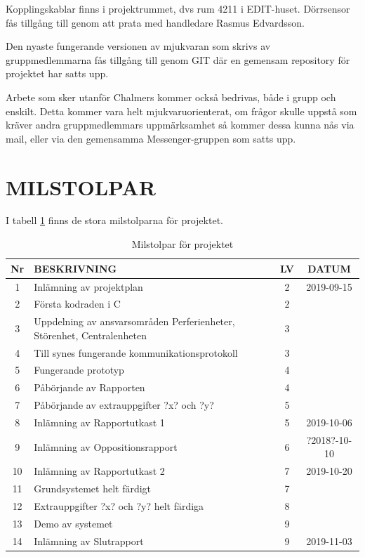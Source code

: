 \documentclass[a4paper]{article}
\begin{document}
Kopplingskablar finns i projektrummet, dvs rum 4211 i EDIT-huset. Dörrsensor fås tillgång till genom att prata med handledare Rasmus Edvardsson.

Den nyaste fungerande versionen av mjukvaran som skrivs av gruppmedlemmarna fås tillgång till genom GIT där en gemensam repository för projektet har satts upp.

Arbete som sker utanför Chalmers kommer också bedrivas, både i grupp och enskilt. Detta kommer vara helt mjukvaruorienterat, om frågor skulle uppstå som kräver andra gruppmedlemmars uppmärksamhet så kommer dessa kunna nås via mail, eller via den gemensamma Messenger-gruppen som satts upp.

\section{MILSTOLPAR}
\label{sec:milstolpar}

I tabell \ref{tab:milstolpar} finns de stora milstolparna för projektet.

	\begin{table}[b]
	\begin{tabular}{|c|l|c|c|}
		\hline
		Nr & BESKRIVNING & LV & DATUM \\ \hline \hline

		1 & Inlämning av projektplan & 2 & 2019-09-15 \\ \hline
		2 & Första kodraden i C & 2 & \\ \hline
		3 & Uppdelning av ansvarsområden Perferienheter, Störenhet, Centralenheten & 3 & \\ \hline
		4 & Till synes fungerande kommunikationsprotokoll & 3 & \\ \hline
		5 & Fungerande prototyp & 4 & \\ \hline
		6 & Påbörjande av Rapporten & 4 & \\ \hline
		7 & Påbörjande av extrauppgifter ?x? och ?y? & 5 & \\ \hline
		8 & Inlämning av Rapportutkast 1 & 5 & 2019-10-06 \\ \hline
		9 & Inlämning av Oppositionsrapport &6 & ?2018?-10-10 \\ \hline
		10 & Inlämning av Rapportutkast 2 & 7 & 2019-10-20 \\ \hline
		11 & Grundsystemet helt färdigt & 7 & \\ \hline
		12 & Extrauppgifter ?x? och ?y? helt färdiga & 8 & \\ \hline
		13 & Demo av systemet & 9 & \\ \hline
		14 & Inlämning av Slutrapport & 9 & 2019-11-03 \\ \hline
	\end{tabular}
	\caption{Milstolpar för projektet}
	\label{tab:milstolpar}
\end{table}
\end{document}

